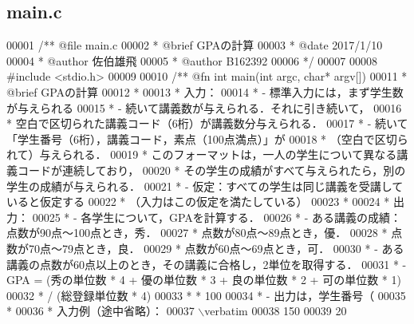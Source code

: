 \subsection{main.\-c}

\begin{DoxyCode}
00001 \textcolor{comment}{/**  @file main.c}
00002 \textcolor{comment}{ *   @brief  GPAの計算}
00003 \textcolor{comment}{ *   @date   2017/1/10}
00004 \textcolor{comment}{ *   @author 佐伯雄飛}
00005 \textcolor{comment}{ *   @author B162392}
00006 \textcolor{comment}{ */}
00007 
00008 \textcolor{preprocessor}{#include <stdio.h>}
00009 \textcolor{comment}{}
00010 \textcolor{comment}{/** @fn int main(int argc, char* argv[])}
00011 \textcolor{comment}{ *  @brief GPAの計算}
00012 \textcolor{comment}{ *}
00013 \textcolor{comment}{ *  入力：}
00014 \textcolor{comment}{ *  - 標準入力には，まず学生数が与えられる}
00015 \textcolor{comment}{ *  - 続いて講義数が与えられる．それに引き続いて，}
00016 \textcolor{comment}{ *    空白で区切られた講義コード（6桁）が講義数分与えられる．}
00017 \textcolor{comment}{ *  - 続いて「学生番号（6桁），講義コード，素点（100点満点）」が}
00018 \textcolor{comment}{ *    （空白で区切られて）与えられる．}
00019 \textcolor{comment}{ *    このフォーマットは，一人の学生について異なる講義コードが連続しており，}
00020 \textcolor{comment}{ *    その学生の成績がすべて与えられたら，別の学生の成績が与えられる．}
00021 \textcolor{comment}{ *  - 仮定：すべての学生は同じ講義を受講していると仮定する}
00022 \textcolor{comment}{ *    （入力はこの仮定を満たしている）}
00023 \textcolor{comment}{ *}
00024 \textcolor{comment}{ *  出力：}
00025 \textcolor{comment}{ *  - 各学生について，GPAを計算する．}
00026 \textcolor{comment}{ *  - ある講義の成績：点数が90点〜100点とき，秀．}
00027 \textcolor{comment}{ *                 点数が80点〜89点とき，優．}
00028 \textcolor{comment}{ *                 点数が70点〜79点とき，良．}
00029 \textcolor{comment}{ *                 点数が60点〜69点とき，可．}
00030 \textcolor{comment}{ *  - ある講義の点数が60点以上のとき，その講義に合格し，2単位を取得する．}
00031 \textcolor{comment}{ *  - GPA = (秀の単位数 * 4 + 優の単位数 * 3 + 良の単位数 * 2 + 可の単位数 * 1)}
00032 \textcolor{comment}{ *           / (総登録単位数 * 4)}
00033 \textcolor{comment}{ *           * 100}
00034 \textcolor{comment}{ *  - 出力は，学生番号（%
00035 \textcolor{comment}{ *}
00036 \textcolor{comment}{ *  入力例（途中省略）：}
00037 \textcolor{comment}{\(\backslash\)verbatim}
00038 \textcolor{comment}{150}
00039 \textcolor{comment}{20}
}
\end{DoxyCode}
